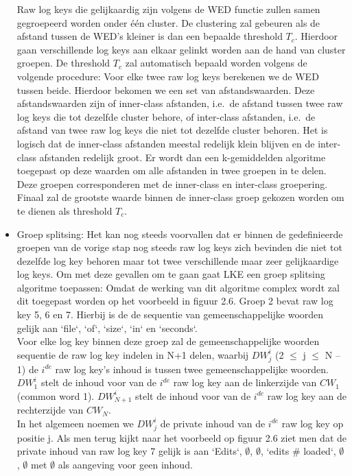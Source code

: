 \begin{itemize}
    Raw log keys die gelijkaardig zijn volgens de WED functie zullen samen gegroepeerd worden onder één cluster. De clustering zal gebeuren als de afstand tussen de WED's kleiner is dan een bepaalde threshold \(T_{c}\). Hierdoor gaan verschillende log keys aan elkaar gelinkt worden aan de hand van cluster groepen. De threshold \(T_{c}\) zal automatisch bepaald worden volgens de volgende procedure:
    \subitem Voor elke twee raw log keys berekenen we de WED tussen beide. Hierdoor bekomen we een set van afstandswaarden. Deze afstandswaarden zijn of inner-class afstanden, i.e.\ de afstand tussen twee raw log keys die tot dezelfde cluster behore, of inter-class afstanden, i.e.\ de afstand van twee raw log keys die niet tot dezelfde cluster behoren. Het is logisch dat de inner-class afstanden meestal redelijk klein blijven en de inter-class afstanden redelijk groot. Er wordt dan een k-gemiddelden algoritme toegepast op deze waarden om alle afstanden in twee groepen in te delen. Deze groepen corresponderen met de inner-class en inter-class groepering. Finaal zal de grootste waarde binnen de inner-class groep gekozen worden om te dienen als threshold \(T_{c}\).\\ 
    \item Groep splitsing: Het kan nog steeds voorvallen dat er binnen de gedefinieerde groepen van de vorige stap nog steeds raw log keys zich bevinden die niet tot dezelfde log key behoren maar tot twee verschillende maar zeer gelijkaardige log keys. Om met deze gevallen om te gaan gaat LKE een groep splitsing algoritme toepassen:
    \subitem Omdat de werking van dit algoritme complex wordt zal dit toegepast worden op het voorbeeld in figuur 2.6. Groep 2 bevat raw log key 5, 6 en 7. Hierbij is de de sequentie van gemeenschappelijke woorden gelijk aan `file`, `of`, `size`, `in` en `seconds`.\\
    Voor elke log key binnen deze groep zal de gemeenschappelijke woorden sequentie de raw log key indelen in N+1 delen, waarbij \(DW_{j}^{i}\) (2 $\leq$ j $\leq$ N -- 1) de \(i^{de}\) raw log key's inhoud is tussen twee gemeenschappelijke woorden.\\ \(DW_{1}^{i}\) stelt de inhoud voor van de \(i^{de}\) raw log key aan de linkerzijde van \(CW_{1}\) (common word 1). \(DW_{N+1}^{i}\) stelt de inhoud voor van de \(i^{de}\) raw log key aan de rechterzijde van \(CW_{N}\).\\
    In het algemeen noemen we \(DW_{j}^{i}\) de private inhoud van de \(i^{de}\) raw log key op positie j. Als men terug kijkt naar het voorbeeld op figuur 2.6 ziet men dat de private inhoud van raw log key 7 gelijk is aan `Edits`, \(\emptyset\), \(\emptyset\), `edits \# loaded`, \(\emptyset\), \(\emptyset\) met \(\emptyset\) als aangeving voor geen inhoud.\\

\end{itemize}
